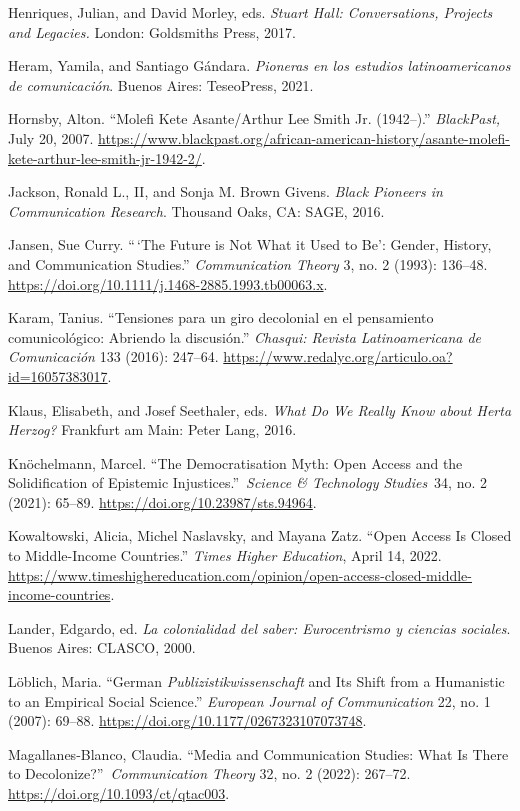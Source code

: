 \documentclass{tufte-handout}
\begin{document}
\begin{hangparas}{.25in}{1}
Henriques, Julian, and David Morley, eds. \emph{Stuart Hall:
Conversations, Projects and Legacies.} London: Goldsmiths Press, 2017.

Heram, Yamila, and Santiago Gándara. \emph{Pioneras en los estudios
latinoamericanos de comunicación}. Buenos Aires: TeseoPress, 2021.

Hornsby, Alton. ``Molefi Kete Asante/Arthur Lee Smith Jr. (1942--).''
\emph{BlackPast,} July 20, 2007.
\href{https://www.blackpast.org/african-american-history/asante-molefi-kete-arthur-lee-smith-jr-1942-2/}{https://www.blackpast.org/african-american-history/asante-molefi-kete-arthur-lee-smith-jr-1942-2/}.

Jackson, Ronald L., II, and Sonja M. Brown Givens. \emph{Black Pioneers
in Communication Research}. Thousand Oaks, CA: SAGE, 2016.

Jansen, Sue Curry. ``\,`The Future is Not What it Used to Be': Gender,
History, and Communication Studies.'' \emph{Communication Theory} 3, no.
2 (1993): 136--48.
\url{https://doi.org/10.1111/j.1468-2885.1993.tb00063.x}.

Karam, Tanius. ``Tensiones para un giro decolonial en el pensamiento
comunicológico: Abriendo la discusión.'' \emph{Chasqui: Revista
Latinoamericana de Comunicación} 133 (2016): 247--64.
\url{https://www.redalyc.org/articulo.oa?id=16057383017}.

Klaus, Elisabeth, and Josef Seethaler, eds. \emph{What Do We Really Know
about Herta Herzog?} Frankfurt am Main: Peter Lang, 2016.

Knöchelmann, Marcel. ``The Democratisation Myth: Open Access and the
Solidification of Epistemic Injustices.''~\emph{Science \& Technology
Studies}~34, no. 2 (2021): 65--89.
\url{https://doi.org/10.23987/sts.94964}.

Kowaltowski, Alicia, Michel Naslavsky, and Mayana Zatz. ``Open Access Is
Closed to Middle-Income Countries.'' \emph{Times Higher Education},
April 14, 2022.
\url{https://www.timeshighereducation.com/opinion/open-access-closed-middle-income-countries}.

Lander, Edgardo, ed. \emph{La colonialidad del saber: Eurocentrismo y
ciencias sociales}. Buenos Aires: CLASCO, 2000.

Löblich, Maria. ``German \emph{Publizistikwissenschaft} and Its Shift
from a Humanistic to an Empirical Social Science.'' \emph{European
Journal of Communication} 22, no. 1 (2007): 69--88.
\url{https://doi.org/10.1177/0267323107073748}.

Magallanes-Blanco, Claudia. ``Media and Communication Studies: What Is
There to Decolonize?''~\emph{Communication Theory} 32, no. 2 (2022):
267--72. \url{https://doi.org/10.1093/ct/qtac003}.


\end{hangparas}
\end{document}
